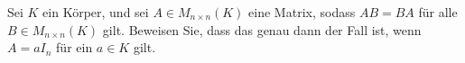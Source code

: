 Sei \( K \) ein Körper, und sei \( A \in M_{n \times n}(K) \) eine Matrix, sodass \( AB = BA \) für alle \( B \in M_{n \times n}(K) \) gilt. Beweisen Sie, dass das genau dann der Fall ist, wenn \( A = aI_n \) für ein \( a \in K \) gilt.